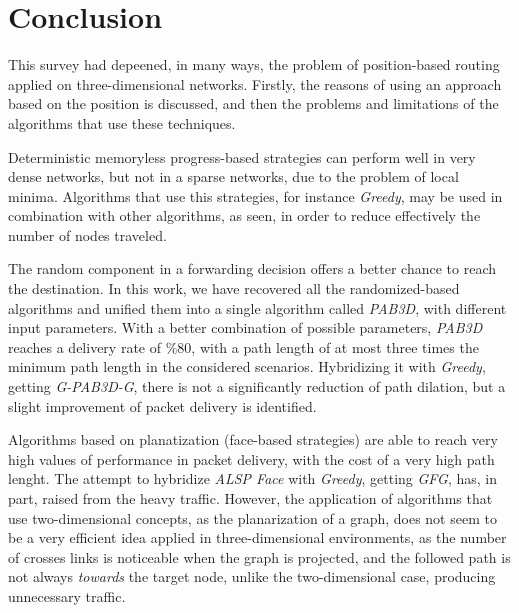 \documentclass[journal,comsoc]{IEEEtran}
\begin{document}
\section{Conclusion}
This survey had depeened, in many ways, the problem of position-based routing applied on three-dimensional networks. Firstly, the reasons of using an approach based on the position is discussed, and then the problems and limitations of the algorithms that use these techniques. 
\par Deterministic memoryless progress-based strategies can perform well in very dense networks, but not in a sparse networks, due to the problem of local minima. Algorithms that use this strategies, for instance \emph{Greedy}, may be used in combination with other algorithms, as seen, in order to reduce effectively the number of nodes traveled.
\par The random component in a forwarding decision offers a better chance to reach the destination. In this work, we have recovered all the randomized-based algorithms and unified them into a single algorithm called \emph{PAB3D}, with different input parameters. With a better combination of possible parameters, \emph{PAB3D} reaches a delivery rate of \%80, with a path length of at most three times the minimum path length in the considered scenarios. Hybridizing it with \emph{Greedy}, getting \emph{G-PAB3D-G}, there is not a significantly reduction of path dilation, but a slight improvement of packet delivery is identified.
\par Algorithms based on planatization (face-based strategies) are able to reach very high values of performance in packet delivery, with the cost of a very high path lenght. The attempt to hybridize \emph{ALSP Face} with \emph{Greedy}, getting \emph{GFG}, has, in part, raised from the heavy traffic. However, the application of algorithms that use two-dimensional concepts, as the planarization of a graph, does not seem to be a very efficient idea applied in three-dimensional environments, as the number of crosses links is noticeable when the graph is projected, and the followed path is not always \emph{towards} the target node, unlike the two-dimensional case, producing unnecessary traffic.



\end{document}
